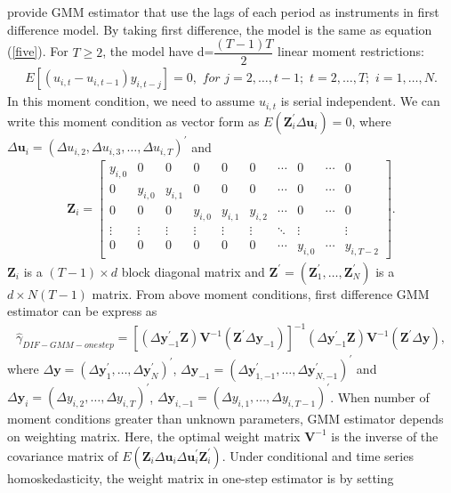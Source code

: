 \documentclass[12pt,a4paper,hyperref]{article}
\begin{document}
\citet{Arellano:1991} provide GMM estimator that use the lags of each period as instruments in first difference model. By taking first difference, the model is the same as equation (\ref{five}). For $T \geq 2$, the model have d=$\dfrac{(T-1)T}{2}$ linear moment restrictions:
\begin{align}
E\left[ \left( u_{i,t}-u_{i,t-1} \right)y_{i,t-j} \right]=0, \,\, for \,\, j=2, \ldots, t-1; \,\, t=2,\ldots, T; \,\, i=1, \ldots, N. \label{8}
\end{align}
In this moment condition, we need to assume $u_{i,t}$ is serial independent.
We can write this moment condition as vector form as $E\left( \boldsymbol{Z}_{i}^{'}\Delta \boldsymbol{u}_{i} \right)=0$, where $\Delta  \boldsymbol{u}_{i}=\left(  \Delta {u}_{i,2}, \Delta {u}_{i,3},\ldots, \Delta {u}_{i,T}  \right)^{'}$ and
\begin{align}
\boldsymbol{Z}_{i}=
\begin{bmatrix}
y_{i,0} & 0      & 0      & 0        &0          & 0         & \cdots    & 0      &\cdots  & 0 \\
0      & y_{i,0} & y_{i,1} &  0       &   0       & 0         & \cdots    & 0      &\cdots  & 0 \\
0      &  0     & 0      & y_{i,0}   & y_{i,1}    & y_{i,2}    & \cdots    & 0      &\cdots  & 0 \\
\vdots & \vdots & \vdots &   \vdots &    \vdots &    \vdots & \ddots    &\vdots  &        & \vdots \\
0      &  0     & 0      &  0       & 0         &0          & \cdots    & y_{i,0} & \cdots & y_{i,T-2}
\end{bmatrix}.
\end{align}
 $\boldsymbol{Z}_{i}$ is a $(T-1)\times d$  block diagonal matrix and $\boldsymbol{Z}^{'}=\left( \boldsymbol{Z}^{'}_{1},\ldots, \boldsymbol{Z}^{'}_{N} \right)$ is a $d \times N(T-1)$ matrix. From above moment conditions, first difference GMM estimator can be express as
\begin{align}
\hat{\gamma}_{DIF-GMM-onestep}=\left[ \left(\Delta \boldsymbol{y}_{-1}^{'} \boldsymbol{Z} \right)\boldsymbol{V}^{-1}\left( \boldsymbol{Z}^{'}\Delta \boldsymbol{y}_{-1}  \right) \right]^{-1}\left(\Delta \boldsymbol{y}_{-1}^{'} \boldsymbol{Z} \right)\boldsymbol{V}^{-1}\left( \boldsymbol{Z}^{'}\Delta \boldsymbol{y}  \right),
\end{align}
where $\Delta \boldsymbol{y}=\left( \Delta \boldsymbol{y}^{'}_{1},\ldots, \Delta \boldsymbol{y}^{'}_{N}  \right)^{'}$, $\Delta \boldsymbol{y}_{-1}=\left( \Delta \boldsymbol{y}^{'}_{1,-1},\ldots, \Delta \boldsymbol{y}^{'}_{N,-1}  \right)^{'}$  and $\Delta \boldsymbol{y}_{i}=\left( \Delta y_{i,2},\ldots, \Delta y_{i,T}  \right)^{'}$, $\Delta \boldsymbol{y}_{i,-1}=\left( \Delta y_{i,1},\ldots, \Delta y_{i,T-1}  \right)^{'}$. When number of moment conditions greater than unknown parameters, GMM estimator depends on weighting matrix. Here, the optimal weight matrix $\boldsymbol{V}^{-1}$ is the inverse of the covariance matrix of $E \left( \boldsymbol{Z}_{i} \Delta \boldsymbol{u}_{i} \Delta \boldsymbol{u}_{i} ^{'} \boldsymbol{Z}_{i}^{'} \right)$. Under conditional and time series homoskedasticity, the weight matrix in one-step estimator is by setting
\end{document}
